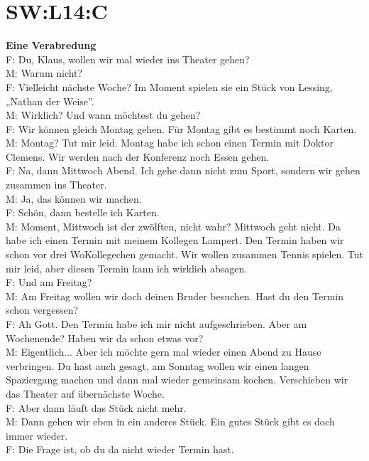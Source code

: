 \section{SW:L14:C}
\noindent
\textbf{Eine Verabredung} \\
F: Du, Klaus, wollen wir mal wieder ins Theater gehen? \\
M: Warum nicht? \\
F: Vielleicht nächste Woche? Im Moment spielen sie ein Stück von Lessing, „Nathan der Weise”. \\
M: Wirklich? Und wann möchtest du gehen?  \\
F: Wir können gleich Montag gehen. Für Montag gibt es bestimmt noch Karten. \\
M: Montag? Tut mir leid. Montag habe ich schon einen Termin mit Doktor Clemens.
Wir werden nach der Konferenz noch Essen gehen. \\
F: Na, dann Mittwoch Abend. Ich gehe dann nicht zum Sport, sondern wir gehen zusammen ins Theater. \\
M: Ja, das können wir machen. \\
F: Schön, dann bestelle ich Karten. \\
M: Moment, Mittwoch ist der zwölften, nicht wahr?
Mittwoch geht nicht. Da habe ich einen Termin mit meinem Kollegen Lampert. 
Den Termin haben wir schon vor drei WoKollegechen gemacht. Wir wollen zusammen Tennis spielen.
Tut mir leid, aber diesen Termin kann ich wirklich absagen. \\
F: Und am Freitag? \\
M: Am Freitag wollen wir doch deinen Bruder besuchen. Hast du den Termin schon vergessen? \\
F: Ah Gott. Den Termin habe ich mir nicht aufgeschrieben.
Aber am Wochenende? Haben wir da schon etwas vor?  \\
M: Eigentlich... Aber ich möchte gern mal wieder einen Abend zu Hause verbringen.
Du hast auch gesagt, am Sonntag wollen wir einen langen Spaziergang machen und
dann mal wieder gemeinsam kochen. Verschieben wir das Theater auf übernächste Woche. \\
F: Aber dann läuft das Stück nicht mehr. \\
M: Dann gehen wir eben in ein anderes Stück. Ein gutes Stück gibt es doch immer wieder. \\
F: Die Frage ist, ob du da nicht wieder Termin hast. \\

